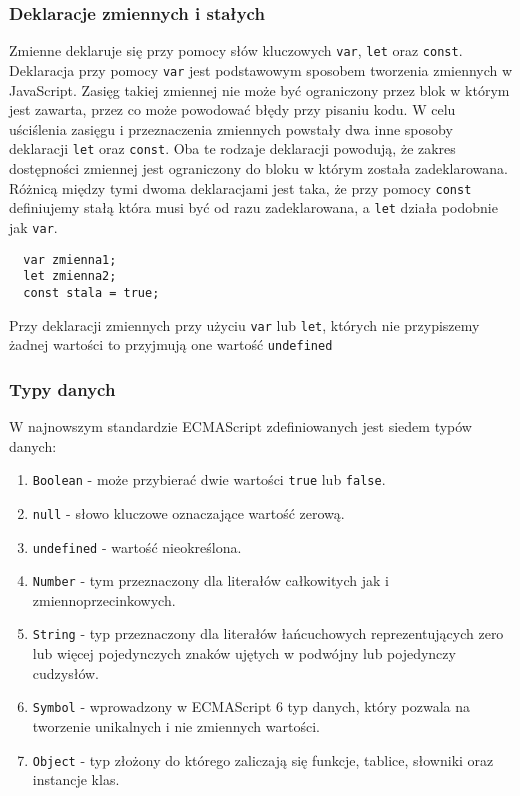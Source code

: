 \documentclass[a4paper]{article}
\begin{document}
\subsubsection{Deklaracje zmiennych i stałych}
\par Zmienne deklaruje się przy pomocy słów kluczowych \texttt{var}, \texttt{let} oraz \texttt{const}. Deklaracja przy pomocy \texttt{var} jest podstawowym sposobem tworzenia zmiennych w JavaScript. Zasięg takiej zmiennej nie może być ograniczony przez blok w którym jest zawarta, przez co może powodować błędy przy pisaniu kodu. W celu uściślenia zasięgu i przeznaczenia zmiennych powstały dwa inne sposoby deklaracji \texttt{let} oraz \texttt{const}. Oba te rodzaje deklaracji powodują, że zakres dostępności zmiennej jest ograniczony do bloku w którym została zadeklarowana. Różnicą między tymi dwoma deklaracjami jest taka, że przy pomocy \texttt{const} definiujemy stałą która musi być od razu zadeklarowana, a \texttt{let} działa podobnie jak \texttt{var}.
\begin{lstlisting}
  var zmienna1;
  let zmienna2;
  const stala = true;
\end{lstlisting}
\par Przy deklaracji zmiennych przy użyciu \texttt{var} lub \texttt{let}, których nie przypiszemy żadnej wartości to przyjmują one wartość \texttt{undefined}

\subsubsection{Typy danych}
\par W najnowszym standardzie ECMAScript zdefiniowanych jest siedem typów danych:
\begin{enumerate}
  \item \texttt{Boolean} - może przybierać dwie wartości \texttt{true} lub \texttt{false}.
  \item \texttt{null} - słowo kluczowe oznaczające wartość zerową. 
  \item \texttt{undefined} - wartość nieokreślona.
  \item \texttt{Number} - tym przeznaczony dla literałów całkowitych jak i zmiennoprzecinkowych.
  \item \texttt{String} - typ przeznaczony dla literałów łańcuchowych reprezentujących zero lub więcej pojedynczych znaków ujętych w podwójny lub pojedynczy cudzysłów.
  \item \texttt{Symbol} - wprowadzony w ECMAScript 6 typ danych, który pozwala na tworzenie unikalnych i nie zmiennych wartości.
  \item \texttt{Object} - typ złożony do którego zaliczają się funkcje, tablice, słowniki oraz instancje klas.
\end{enumerate}
\end{document}
